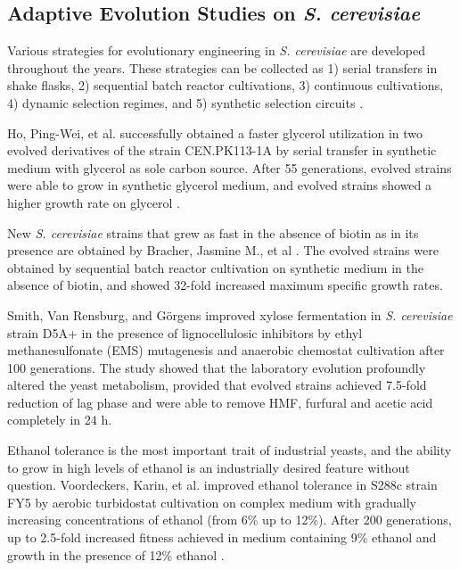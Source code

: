 \subsection{Adaptive Evolution Studies on \emph{S. cerevisiae}}

Various strategies for evolutionary engineering in \emph{S. cerevisiae} are developed throughout the years. These strategies can be collected as 1) serial transfers in shake flasks, 2) sequential batch reactor cultivations, 3) continuous cultivations, 4) dynamic selection regimes, and 5) synthetic selection circuits \cite{mans2018under}.

Ho, Ping-Wei, et al. successfully obtained a faster glycerol utilization in two evolved derivatives of the strain CEN.PK113-1A by serial transfer in synthetic medium with glycerol as sole carbon source. After 55 generations, evolved strains were able to grow in synthetic glycerol medium, and evolved strains showed a higher growth rate on glycerol \cite{ho2017sole}.

New \emph{S. cerevisiae} strains that grew as fast in the absence of biotin as in its presence are obtained by Bracher, Jasmine M., et al \cite{bracher2017laboratory}. The evolved strains were obtained by sequential batch reactor cultivation on synthetic medium in the absence of biotin, and showed 32-fold increased maximum specific growth rates.

Smith, Van Rensburg, and Görgens improved xylose fermentation in \emph{S. cerevisiae} strain D5A+ in the presence of lignocellulosic inhibitors by ethyl methanesulfonate (EMS) mutagenesis and anaerobic chemostat cultivation after 100 generations\cite{smith2014simultaneously}. The study showed that the laboratory evolution profoundly altered the yeast metabolism, provided that evolved strains achieved 7.5-fold reduction of lag phase and were able to remove HMF, furfural and acetic acid completely in 24 h.

Ethanol tolerance is the most important trait of industrial yeasts, and the ability to grow in high levels of ethanol is an industrially desired feature without question. Voordeckers, Karin, et al. improved ethanol tolerance
in S288c strain FY5 by aerobic turbidostat cultivation on complex medium with gradually increasing concentrations of ethanol (from 6\% up to 12\%). After 200 generations, up to 2.5-fold increased fitness achieved in medium containing 9\% ethanol and growth in the presence of 12\% ethanol \cite{voordeckers2015adaptation}.

